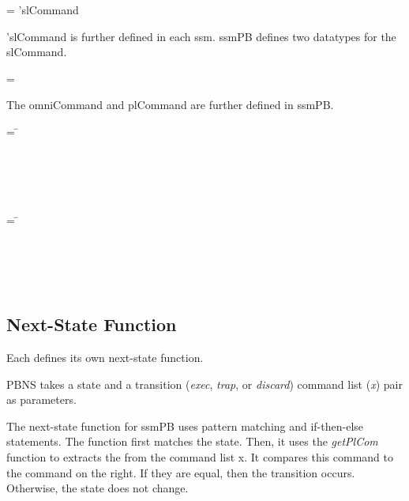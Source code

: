 \documentclass[../../main/main.tex]{subfiles}
\begin{document}
 =   \HOLTokenBar{}  'slCommand

 'slCommand is further defined in each \gls{ssm}.  ssmPB defines two datatypes for the slCommand.

 =   \HOLTokenBar{}  

The omniCommand and plCommand are further defined in ssmPB.

\begin{tabbing}
 = \= \\
						\>\HOLTokenBar{} \\
            					\>\HOLTokenBar{}  \\
						\>\HOLTokenBar{} \\
            					\>\HOLTokenBar{}  \\
						\>\HOLTokenBar{} 
\end{tabbing}

\begin{tabbing}
 = \= \\
						\>\HOLTokenBar{}  \\
						\>\HOLTokenBar{}  \\
						\>\HOLTokenBar{} \\
          					\>\HOLTokenBar{}  \\
						\>\HOLTokenBar{} 
\end{tabbing}

\subsection{Next-State Function}
Each  defines its own next-state function.  

\HOLssmPBIntegratedTheoremsPBNSXXdef

PBNS takes a state and a transition (\textit{exec}, \textit{trap}, or \textit{discard}) command list (\textit{x}) pair as parameters.

The next-state function for ssmPB uses pattern matching and if-then-else statements.  The function first matches the state.  Then, it uses the \textit{getPlCom} function to extracts the  from the command list x. It compares this command to the command on the right.  If they are equal, then the transition occurs.  Otherwise, the state does not change.  
\end{document}

